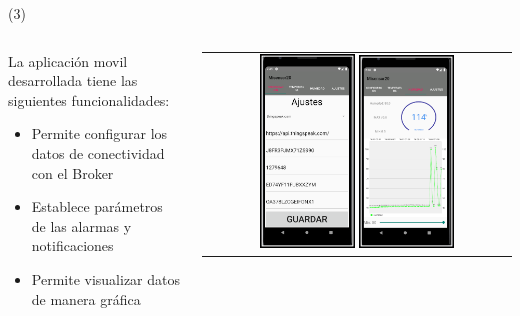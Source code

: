 \begin{frame}{ (3)}
\begin{columns}
\begin{column}{0.40\textwidth}
La aplicación movil desarrollada tiene las siguientes funcionalidades:
\begin{itemize}
        \item Permite configurar los datos de conectividad con el Broker
        \item Establece parámetros de las alarmas y notificaciones
        \item Permite visualizar datos de manera gráfica
	\end{itemize}
\end{column}
\begin{column}{0.60\textwidth}  
\begin{center}
     \begin{tabular}{c}
         \includegraphics[width=0.32\textwidth]{2021_IoT_JoseRamon/figs/pantalla de configuracion.png}
\includegraphics[width=0.32\textwidth]{2021_IoT_JoseRamon/figs/pantalla de humedad.png}

\end{tabular}
\end{center}
\end{column}
\end{columns}
\end{frame}
